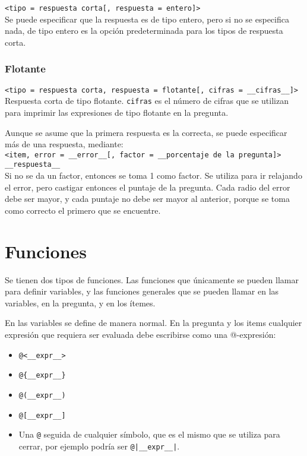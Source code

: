 \documentclass[12pt]{article}
\theoremstyle{definition}
\begin{document}
\noindent \verb|<tipo = respuesta corta[, respuesta = entero]>| \\[1ex]
Se puede especificar que la respuesta es de tipo entero, pero si no se especifica nada, de tipo entero es la opción predeterminada para los tipos de respuesta corta.


\subsubsection{Flotante}

\noindent \verb|<tipo = respuesta corta, respuesta = flotante[, cifras = __cifras__]>| \\[1ex]
Respuesta corta de tipo flotante. \verb|cifras| es el n\'umero de cifras que se utilizan para imprimir las expresiones de tipo flotante en la pregunta.

Aunque se asume que la primera respuesta es la correcta, se puede especificar m\'as de una respuesta, mediante: \\[1ex]
\verb|<item, error = __error__[, factor = __porcentaje de la pregunta]>| \\
\verb|__respuesta__| \\[1ex]
Si no se da un factor, entonces se toma 1 como factor. Se utiliza para ir relajando el error, pero castigar entonces el puntaje de la pregunta. Cada radio del error debe ser mayor, y cada puntaje no debe ser mayor al anterior, porque se toma como correcto el primero que se encuentre.


\section{Funciones}

Se tienen dos tipos de funciones. Las funciones que \'unicamente se pueden llamar para definir variables, y las funciones generales que se pueden llamar en las variables, en la pregunta, y en los \'itemes.

En las variables se define de manera normal. En la pregunta y los items cualquier expresi\'on que requiera ser evaluada debe escribirse como una @-expresi\'on:
\begin{itemize}
  \item \verb|@<__expr__>|
  \item \verb|@{__expr__}|
  \item \verb|@(__expr__)|
  \item \verb|@[__expr__]|
  \item Una \verb|@| seguida de cualquier s\'imbolo, que es el mismo que se utiliza para cerrar, por ejemplo podr\'ia ser \verb/@|__expr__|/. 
\end{itemize}
\end{document}
